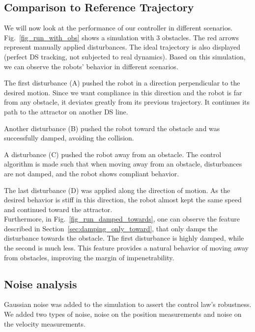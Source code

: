 \documentclass[conference]{IEEEtran}
\begin{document}
\subsection{Comparison to Reference Trajectory}
We will now look at the performance of our controller in different scenarios. Fig.~\ref{fig_run_with_obs} shows a simulation with 3 obstacles. The red arrows represent manually applied disturbances. The ideal trajectory is also displayed (perfect DS tracking, not subjected to real dynamics). Based on this simulation, we can observe the robots' behavior in different scenarios.

The first disturbance (A) pushed the robot in a direction perpendicular to the desired motion. Since we want compliance in this direction and the robot is far from any obstacle, it deviates greatly from its previous trajectory. It continues its path to the attractor on another DS line.

Another disturbance (B) pushed the robot toward the obstacle and was successfully damped, avoiding the collision.

A disturbance (C) pushed the robot away from an obstacle. The control algorithm is made such that when moving away from an obstacle, disturbances are not damped, and the robot shows compliant behavior. 

The last disturbance (D) was applied along the direction of motion. As the desired behavior is stiff in this direction, the robot almost kept the same speed and continued toward the attractor. \\


Furthermore, in Fig.~\ref{fig_run_damped_towards}, one can observe the feature described in Section~\ref{sec:damping_only_toward}, that only damps the disturbance towards the obstacle.
The first disturbance is highly damped, while the second is much less. This feature provides a natural behavior of moving away from obstacles, improving the margin of impenetrability. 

\subsection{Noise analysis}
Gaussian noise was added to the simulation to assert the control law's robustness. We added two types of noise, noise on the position measurements and noise on the velocity measurements. 
\end{document}
